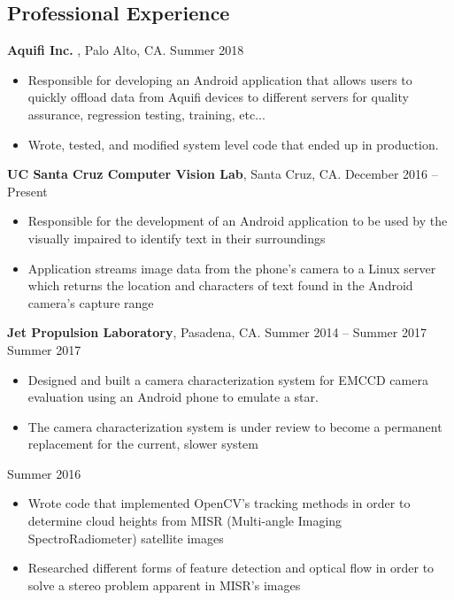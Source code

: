 \documentclass[margin,line]{res}
\newcommand\tab[1][1cm]{\hspace*{#1}}
\begin{document}
\begin{resume}
\section{\sc Professional Experience}
{\bf Aquifi Inc. }, Palo Alto, CA.  \hfill{Summer 2018}\\
\tab[4mm]{\em Software Architecture Intern}\hfill 
\begin{itemize} %
	\item 	Responsible for developing an Android application that allows users to quickly offload data from Aquifi devices to different servers for quality assurance, regression testing, training, etc...
	\item Wrote, tested, and modified system level code that ended up in production.
\end{itemize}
{\bf UC Santa Cruz Computer Vision Lab}, Santa Cruz, CA.  \hfill{December 2016 -- Present}\\
\tab[4mm]{\em Software Research Assistant}\hfill 
\begin{itemize} %
\item 	Responsible for the development of an Android application to be used by the visually impaired to identify text in their surroundings
\item 	Application streams image data from the phone's camera to a Linux server which returns the location and characters of text found in the Android camera's capture range
\end{itemize}
{\bf Jet Propulsion Laboratory}, Pasadena, CA. \hfill{Summer 2014 -- Summer 2017}\\
\tab[4mm]{\em Software and Hardware Testbed Development Intern}\hfill {Summer 2017}
\begin{itemize} %
\item 	Designed and built a camera characterization system for EMCCD camera evaluation using an Android phone to emulate a star.
\item 	The camera characterization system is under review to become a permanent replacement for the current, slower system
\end{itemize}
\tab[4mm]{\em Computer Vision Intern}\hfill {Summer 2016}
\begin{itemize} %
\item  	Wrote code that implemented OpenCV’s tracking methods in order to determine cloud heights from MISR (Multi-angle Imaging SpectroRadiometer) satellite images  
\item 	Researched different forms of feature detection and optical flow in order to solve a stereo problem apparent in MISR’s images 

\end{itemize}
\end{resume}
\end{document}

